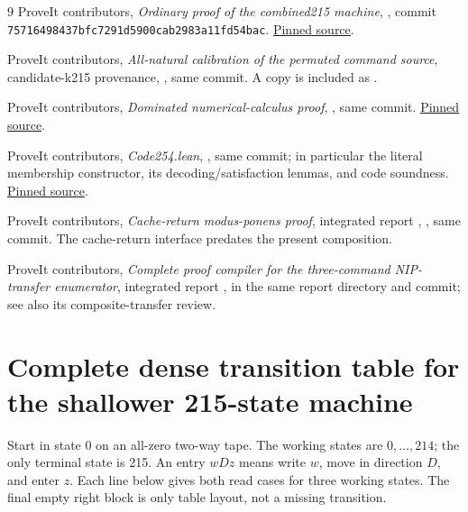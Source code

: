 \documentclass[11pt]{article}
\theoremstyle{definition}
\newcommand{\pin}{\texttt{75716498437bfc7291d5900cab2983a11fd54bac}}
\begin{document}
\clearpage
\begingroup\raggedright
\begin{thebibliography}{9}
ProveIt contributors, \emph{Ordinary proof of the combined215 machine},
,
commit \pin.
\href{https://github.com/VladimirReshetnikov/ProveIt/blob/75716498437bfc7291d5900cab2983a11fd54bac/Computability/BusyBeaver/Research/ZFC/candidate-k215/proof.md}{Pinned source}.

ProveIt contributors, \emph{All-natural calibration of the permuted command
source}, candidate-k215 provenance, ,
same commit. A copy is included as .

ProveIt contributors, \emph{Dominated numerical-calculus proof},
,
same commit.
\href{https://github.com/VladimirReshetnikov/ProveIt/blob/75716498437bfc7291d5900cab2983a11fd54bac/Computability/BusyBeaver/Research/ZFC/candidate-k218/alternatives/dominated/proof.md}{Pinned source}.

ProveIt contributors, \emph{Code254.lean},
,
same commit; in particular the literal membership constructor, its
decoding/satisfaction lemmas, and code soundness.
\href{https://github.com/VladimirReshetnikov/ProveIt/blob/75716498437bfc7291d5900cab2983a11fd54bac/Computability/BusyBeaver/Lean/BusyBeaver/ZFC/Code254.lean}{Pinned source}.

ProveIt contributors, \emph{Cache-return modus-ponens proof}, integrated
report ,
,
same commit. The cache-return interface predates the present composition.

ProveIt contributors, \emph{Complete proof compiler for the three-command
NIP-transfer enumerator}, integrated report
, in the same report
directory and commit; see also its composite-transfer review.
\end{thebibliography}
\endgroup

\clearpage
\appendix
\section{Complete dense transition table for the shallower 215-state machine}

Start in state 0 on an all-zero two-way tape. The working states are
\(0,\ldots,214\); the only terminal state is 215. An entry \(wDz\)
means write \(w\), move in direction \(D\), and enter \(z\). Each line
below gives both read cases for three working states. The final empty right
block is only table layout, not a missing transition.


\end{document}
